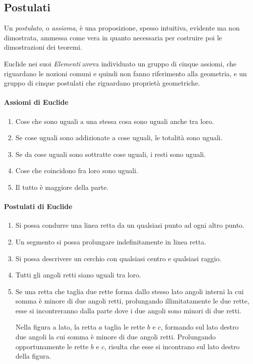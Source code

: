 \vspazio\ovalbox{\risolvi \ref{ese:1.32}}

\subsection{Postulati}

Un \emph{postulato}, o \emph{assioma}, è una proposizione, spesso intuitiva, evidente ma non dimostrata, ammessa come vera in quanto necessaria per costruire poi le dimostrazioni dei teoremi.

Euclide nei suoi \emph{Elementi} aveva individuato un gruppo di cinque assiomi, che riguardano le nozioni comuni e quindi non fanno riferimento alla geometria, e un gruppo di cinque postulati che riguardano proprietà geometriche.

\paragraph{Assiomi di Euclide}
\begin{enumerate}[label=\Roman{*}.]
\item Cose che sono uguali a una stessa cosa sono uguali anche tra loro.
\item Se cose uguali sono addizionate a cose uguali, le totalità sono uguali.
\item Se da cose uguali sono sottratte cose uguali, i resti sono uguali.
\item Cose che coincidono fra loro sono uguali.
\item Il tutto è maggiore della parte.
\end{enumerate}

\paragraph{Postulati di Euclide}
\begin{enumerate}[label=\Roman{*}.]
\item Si possa condurre una linea retta da un qualsiasi punto ad ogni altro punto.
\item Un segmento si possa prolungare indefinitamente in linea retta.
\item Si possa descrivere un cerchio con qualsiasi centro e qualsiasi raggio.
\item Tutti gli angoli retti siano uguali tra loro.
\item Se una retta che taglia due rette forma dallo stesso lato angoli interni la cui somma è minore di due angoli retti, prolungando illimitatamente le due rette, esse si incontreranno dalla parte dove i due angoli sono minori di due retti.

\begin{minipage}{.49\textwidth}
\centering
\end{minipage}\hfil
\begin{minipage}{.45\textwidth}
Nella figura a lato, la retta $a$ taglia le rette $b$ e $c$, formando sul lato destro due angoli la cui somma è minore di due angoli retti. Prolungando opportunamente le rette $b$ e $c$, risulta che esse si incontrano sul lato destro della figura.
\end{minipage}
\end{enumerate}

